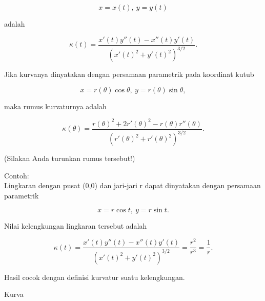 \documentclass[a4paper,10pt]{article}
\begin{document}
\begin{eulernotebook}
\begin{eulercomment}
\end{eulercomment}
\begin{eulerformula}
\[
x=x(t),\ y=y(t)
\]
\end{eulerformula}
\begin{eulercomment}
adalah

\end{eulercomment}
\begin{eulerformula}
\[
\kappa(t) = \frac{x'(t)y''(t)-x''(t)y'(t)}{\left(x'(t)^2+y'(t)^2\right)^{3/2}}.
\]
\end{eulerformula}
\begin{eulercomment}
Jika kurvanya dinyatakan dengan persamaan parametrik pada koordinat kutub

\end{eulercomment}
\begin{eulerformula}
\[
x=r(\theta)\cos\theta,\ y=r(\theta)\sin\theta,
\]
\end{eulerformula}
\begin{eulercomment}
maka rumus kurvaturnya adalah

\end{eulercomment}
\begin{eulerformula}
\[
\kappa(\theta) = \frac{r(\theta)^2+2r'(\theta)^2-r(\theta)r''(\theta)}{\left(r'(\theta)^2+r'(\theta)^2\right)^{3/2}}.
\]
\end{eulerformula}
\begin{eulercomment}
(Silakan Anda turunkan rumus tersebut!)

Contoh:\\
Lingkaran dengan pusat (0,0) dan jari-jari r dapat dinyatakan dengan persamaan parametrik

\end{eulercomment}
\begin{eulerformula}
\[
x=r\cos t,\ y=r\sin t.
\]
\end{eulerformula}
\begin{eulercomment}
Nilai kelengkungan lingkaran tersebut adalah

\end{eulercomment}
\begin{eulerformula}
\[
\kappa(t)=\frac{x'(t)y''(t)-x''(t)y'(t)}{\left(x'(t)^2+y'(t)^2\right)^{3/2}}=\frac{r^2}{r^3}=\frac 1 r.
\]
\end{eulerformula}
\begin{eulercomment}
Hasil cocok dengan definisi kurvatur suatu kelengkungan.
\end{eulercomment}
\begin{eulercomment}
Kurva


\end{eulercomment}
\end{eulernotebook}
\end{document}
